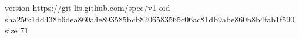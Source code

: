 version https://git-lfs.github.com/spec/v1
oid sha256:1dd438b6dea860a4e893585bcb8206583565c06ac81db9abe860b8b4fab1f590
size 71
